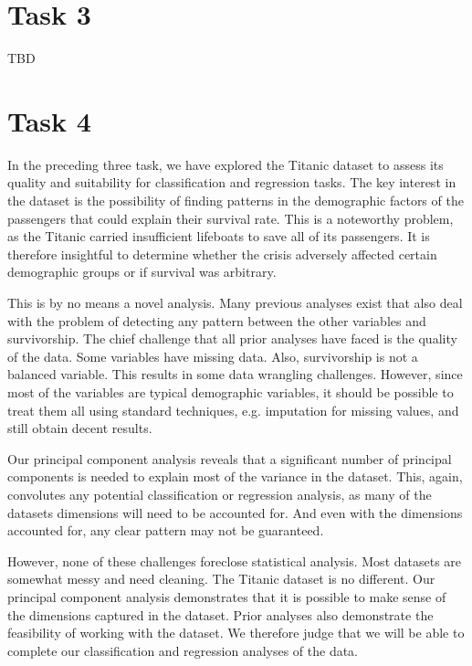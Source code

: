 \documentclass[twoside,11pt]{article}
\makeatletter
\let\@oldsection\section
\renewcommand\section[1]{\@oldsection*{#1}}
\makeatother
\begin{document}
\section{Task 3}


TBD




\section{Task 4}

In the preceding three task, we have explored the Titanic dataset to assess its quality and suitability for classification and regression tasks. The key interest in the dataset is the possibility of finding patterns in the demographic factors of the passengers that could explain their survival rate. This is a noteworthy problem, as the Titanic carried insufficient lifeboats to save all of its passengers. It is therefore insightful to determine whether the crisis adversely affected certain demographic groups or if survival was arbitrary.

This is by no means a novel analysis. Many previous analyses exist that also deal with the problem of detecting any pattern between the other variables and survivorship. The chief challenge that all prior analyses have faced is the quality of the data. Some variables have missing data. Also, survivorship is not a balanced variable. This results in some data wrangling challenges. However, since most of the variables are typical demographic variables, it should be possible to treat them all using standard techniques, e.g. imputation for missing values, and still obtain decent results.

Our principal component analysis reveals that a significant number of principal components is needed to explain most of the variance in the dataset. This, again, convolutes any potential classification or regression analysis, as many of the datasets dimensions will need to be accounted for. And even with the dimensions accounted for, any clear pattern may not be guaranteed.

However, none of these challenges foreclose statistical analysis. Most datasets are somewhat messy and need cleaning. The Titanic dataset is no different. Our principal component analysis demonstrates that it is possible to make sense of the dimensions captured in the dataset. Prior analyses also demonstrate the feasibility of working with the dataset. We therefore judge that we will be able to complete our classification and regression analyses of the data.
\end{document}

